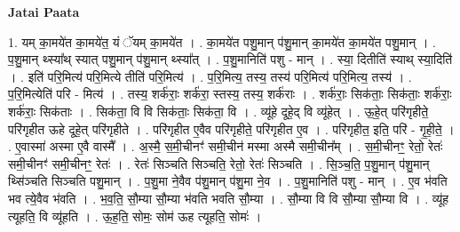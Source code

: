 \documentclass[17pt]{extarticle}
\begin{document}
\textbf{Jatai Paata} \newline

1. यम् का॒मये॑त का॒मये॑त॒ यं ॅयम् का॒मये॑त । . का॒मये॑त पशु॒मान् प॑शु॒मान् का॒मये॑त का॒मये॑त पशु॒मान् । . प॒शु॒मान् थ्स्या᳚थ् स्यात् पशु॒मान् प॑शु॒मान् थ्स्या᳚त् । . प॒शु॒मानिति॑ पशु - मान् । . स्या॒ दितीति॑ स्याथ् स्या॒दिति॑ । . इति॑ परि॒मित्य॑ परि॒मित्ये तीति॑ परि॒मित्य॑ । . प॒रि॒मित्य॒ तस्य॒ तस्य॑ परि॒मित्य॑ परि॒मित्य॒ तस्य॑ । . प॒रि॒मित्येति॑ परि - मित्य॑ । . तस्य॒ शर्क॑राः॒ शर्क॑रा॒ स्तस्य॒ तस्य॒ शर्क॑राः । . शर्क॑राः॒ सिक॑ताः॒ सिक॑ताः॒ शर्क॑राः॒ शर्क॑राः॒ सिक॑ताः । . सिक॑ता॒ वि वि सिक॑ताः॒ सिक॑ता॒ वि । . व्यू॑हे दूहे॒द् वि व्यू॑हेत् । . ऊ॒हे॒त् परि॑गृहीते॒ परि॑गृहीत ऊहे दूहे॒त् परि॑गृहीते । . परि॑गृहीत ए॒वैव परि॑गृहीते॒ परि॑गृहीत ए॒व । . परि॑गृहीत॒ इति॒ परि॑ - गृ॒ही॒ते॒ । . ए॒वास्मा॑ अस्मा ए॒वै वास्मै᳚ । . अ॒स्मै॒ स॒मी॒चीनꣳ॑ समी॒चीन॑ मस्मा अस्मै समी॒चीन᳚म् । . स॒मी॒चीनꣳ॒॒ रेतो॒ रेतः॑ समी॒चीनꣳ॑ समी॒चीनꣳ॒॒ रेतः॑ । . रेतः॑ सिञ्चति सिञ्चति॒ रेतो॒ रेतः॑ सिञ्चति । . सि॒ञ्च॒ति॒ प॒शु॒मान् प॑शु॒मान् थ्सि॑ञ्चति सिञ्चति पशु॒मान् । . प॒शु॒मा ने॒वैव प॑शु॒मान् प॑शु॒मा ने॒व । . प॒शु॒मानिति॑ पशु - मान् । . ए॒व भ॑वति भव त्ये॒वैव भ॑वति । . भ॒व॒ति॒ सौ॒म्या सौ॒म्या भ॑वति भवति सौ॒म्या । . सौ॒म्या वि वि सौ॒म्या सौ॒म्या वि । . व्यू॑ह त्यूहति॒ वि व्यू॑हति । . ऊ॒ह॒ति॒ सोमः॒ सोम॑ ऊह त्यूहति॒ सोमः॑ । \newline
\end{document}

